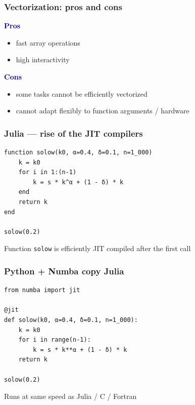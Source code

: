 \documentclass[
    xcolor={svgnames,dvipsnames},
    hyperref={colorlinks, citecolor=DeepPink4, linkcolor=DarkRed, urlcolor=DarkBlue}
    ]{beamer}  %
\newcommand{\navy}[1]{\textcolor{DarkBlue}{\bf #1}}
\newcommand{\1}{\mathbbm 1}
\begin{document}
\begin{frame}
    \frametitle{Vectorization: pros and cons}

    \navy{Pros}

    \begin{itemize}
        \item fast array operations
        \item high interactivity 
    \end{itemize}

    \vspace{0.5em}
    \vspace{0.5em}

    \navy{Cons}

    \begin{itemize}
        \item some tasks cannot be efficiently vectorized
        \vspace{0.2em}
        \item cannot adapt flexibly to function arguments /
            hardware
    \end{itemize}


\end{frame}




\begin{frame}[fragile]
    \frametitle{Julia --- rise of the JIT compilers}
    
    \begin{verbatim}
function solow(k0, α=0.4, δ=0.1, n=1_000)
    k = k0
    for i in 1:(n-1)
        k = s * k^α + (1 - δ) * k
    end
    return k
end

solow(0.2)
    \end{verbatim}

    Function \texttt{solow} is efficiently JIT compiled after the first call

\end{frame}

\begin{frame}[fragile]
    \frametitle{Python + Numba copy Julia}
    
    \begin{verbatim}
from numba import jit

@jit
def solow(k0, α=0.4, δ=0.1, n=1_000):
    k = k0
    for i in range(n-1):
        k = s * k**α + (1 - δ) * k
    return k

solow(0.2)
    \end{verbatim}


    Runs at same speed as Julia / C / Fortran

\end{frame}
\end{document}
